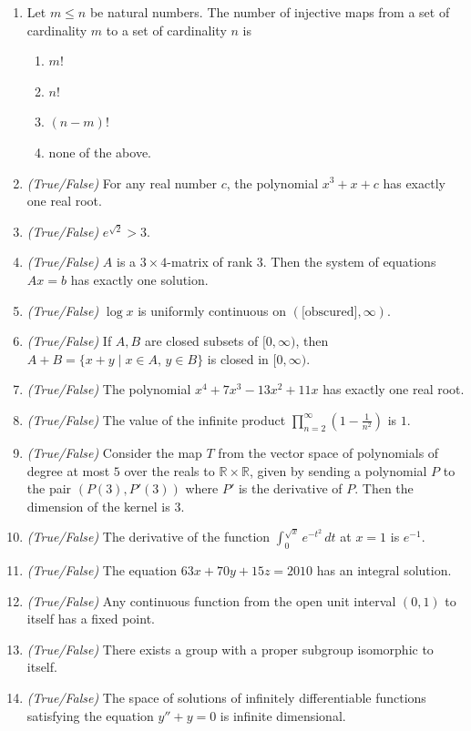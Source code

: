 \documentclass[11pt, a4paper]{article}
\begin{document}
\begin{enumerate}
  \item Let $m \le n$ be natural numbers. The number of injective maps from a set of cardinality $m$ to a set of cardinality $n$ is
  \begin{enumerate}[label=(\alph*)]
    \item $m!$
    \item $n!$
    \item $(n - m)!$
    \item none of the above.
  \end{enumerate}

  \item \emph{(True/False)} For any real number $c$, the polynomial $x^3 + x + c$ has exactly one real root.
  \item \emph{(True/False)} $e^{\sqrt{2}} > 3$.
  \item \emph{(True/False)} $A$ is a $3 \times 4$-matrix of rank $3$. Then the system of equations $Ax = b$ has exactly one solution.
  \item \emph{(True/False)} $\log x$ is uniformly continuous on $(\text{[obscured]}, \infty)$.
  \item \emph{(True/False)} If $A, B$ are closed subsets of $[0, \infty)$, then $A + B = \{x + y \mid x \in A, \, y \in B\}$ is closed in $[0, \infty)$.
  \item \emph{(True/False)} The polynomial $x^4 + 7x^3 - 13x^2 + 11x$ has exactly one real root.
  \item \emph{(True/False)} The value of the infinite product $\displaystyle \prod_{n=2}^\infty \left(1 - \frac{1}{n^2}\right)$ is $1$.
  \item \emph{(True/False)} Consider the map $T$ from the vector space of polynomials of degree at most $5$ over the reals to $\mathbb{R} \times \mathbb{R}$, given by sending a polynomial $P$ to the pair $(P(3), P'(3))$ where $P'$ is the derivative of $P$. Then the dimension of the kernel is $3$.
  \item \emph{(True/False)} The derivative of the function $\displaystyle \int_0^{\sqrt{x}} e^{-t^2}\,dt$ at $x = 1$ is $e^{-1}$.
  \item \emph{(True/False)} The equation $63x + 70y + 15z = 2010$ has an integral solution.
  \item \emph{(True/False)} Any continuous function from the open unit interval $(0, 1)$ to itself has a fixed point.
  \item \emph{(True/False)} There exists a group with a proper subgroup isomorphic to itself.
  \item \emph{(True/False)} The space of solutions of infinitely differentiable functions satisfying the equation $y'' + y = 0$ is infinite dimensional.

\end{enumerate}
\end{document}
